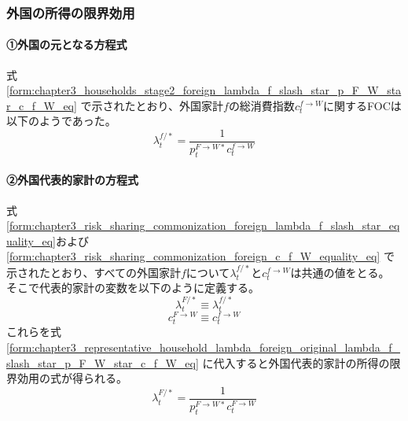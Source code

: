 \subsubsection{外国の所得の限界効用}
\label{sec:chapter3_representative_household_lambda_foreign}

\paragraph{①外国の元となる方程式}
\label{sec:chapter3_representative_household_lambda_foreign_original}
式
\eqref{form:chapter3_households_stage2_foreign_lambda_f_slash_star_p_F_W_star_c_f_W_eq}
で示されたとおり、外国家計\(f\)の総消費指数\(c_t^{f\to W}\)に関するFOCは以下のようであった。
\begin{equation}
\label{form:chapter3_representative_household_lambda_foreign_original_lambda_f_slash_star_p_F_W_star_c_f_W_eq}
    \lambda_t^{f/*}=\frac{1}{p_t^{F\to W*}c_t^{f\to W}}
\end{equation}

\paragraph{②外国代表的家計の方程式}
\label{sec:chapter3_representative_household_lambda_foreign_representative}
式
\eqref{form:chapter3_risk_sharing_commonization_foreign_lambda_f_slash_star_equality_eq}および
\eqref{form:chapter3_risk_sharing_commonization_foreign_c_f_W_equality_eq}
で示されたとおり、すべての外国家計\(f\)について\(\lambda_t^{f/*}\)と\(c_t^{f\to W}\)は共通の値をとる。
そこで代表的家計の変数を以下のように定義する。
\begin{equation}
\label{form:chapter3_representative_household_lambda_foreign_representative_lambda_F_slash_star_def}
    \lambda_t^{F/*}\equiv\lambda_t^{f/*}
\end{equation}
\begin{equation}
\label{form:chapter3_representative_household_lambda_foreign_representative_c_F_W_def}
    c_t^{F\to W}\equiv c_t^{f\to W}
\end{equation}
これらを式
\eqref{form:chapter3_representative_household_lambda_foreign_original_lambda_f_slash_star_p_F_W_star_c_f_W_eq}
に代入すると外国代表的家計の所得の限界効用の式が得られる。
\begin{equation}
\label{form:chapter3_representative_household_lambda_foreign_original_lambda_F_slash_star_p_F_W_star_c_F_W_eq}
    \lambda_t^{F/*}=\frac{1}{p_t^{F\to W*}c_t^{F\to W}}
\end{equation}